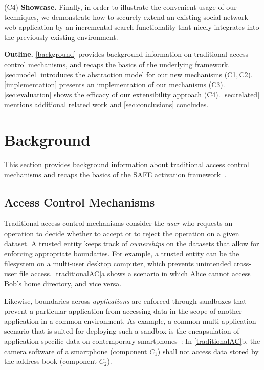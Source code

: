 \documentclass{src/acm_proc_article-sp} \else
\newcommand\myparagraph[1]{\medskip\noindent\textbf{#1.}}
\newcommand\SAFE{SAFE\xspace}
\begin{document}
(C4) \textbf{Showcase.} Finally, in order to illustrate the
convenient usage of our techniques, we demonstrate how to securely
extend an existing social network web application by an incremental
search functionality that nicely integrates into the previously
existing environment.







\myparagraph{Outline} \autoref{background} provides
background information on traditional access control
mechanisms, and recaps the basics of the underlying
framework. \autoref{sec:model} introduces the abstraction
model for our new mechanisms (C1,\,C2).
\autoref{implementation} presents an implementation of our
mechanisms (C3). \autoref{sec:evaluation} shows the efficacy
of our extensibility approach (C4). \autoref{sec:related}
mentions additional related work and
\autoref{sec:conclusions} concludes.
   \section{Background}
\label{background}

This section provides background information about
traditional access control mechanisms and recaps the basics
of the \SAFE activation framework~\cite{Reischuk12:SAFE}.

\subsection{Access Control Mechanisms}

Traditional access control mechanisms consider the \emph{user} who
requests an operation to decide whether to accept or to reject the
operation on a given dataset. A trusted entity keeps track of
\emph{ownerships} on the datasets that allow for enforcing
appropriate boundaries.
For example, a trusted entity can be the filesystem on a
multi-user desktop computer, which prevents unintended
cross-user file access. \autoref{traditionalAC}a shows a
scenario in which Alice cannot access Bob's home directory,
and vice versa.

Likewise, boundaries across \emph{applications} are
enforced through sandboxes that prevent a particular
application from accessing data in the scope of another
application in a common environment.
As example, a common multi-application scenario that is
suited for deploying such a sandbox is the encapsulation
of application-specific data on contemporary smartphones~\cite{Android}:
In \autoref{traditionalAC}b, the camera software of a
smartphone (component $C_1$) shall not access data stored
by the address book (component $C_2$).
\end{document}
